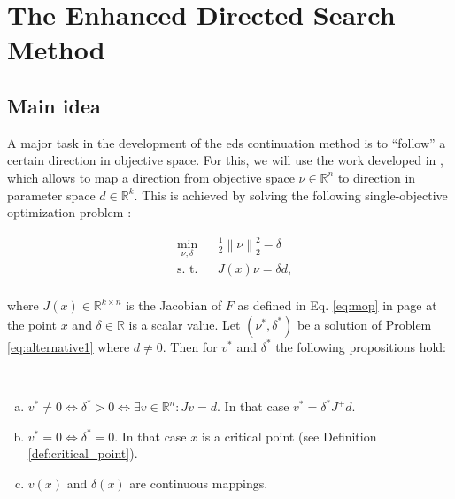 \section{The Enhanced Directed Search Method}
\label{sec:eds_method}

\subsection{Main idea}
\label{sec:direction_objective_space}

A major task in the development of the \gls{eds} continuation method is to ``follow'' a certain direction in objective space. For this, we will use the work developed in \cite{ds2}, which allows to map a direction from objective space $\nu \in \mathbb{R}^n$ to  direction  in parameter space $d \in \mathbb{R}^k$. This is achieved by solving the following single-objective optimization problem \cite{ds2}:

\begin{equation}
	\begin{aligned}
	& \underset{\nu, \delta}{\text{min}}
	& & \frac{1}{2}\left\| \nu \right\|_2^2 - \delta\\
	& \text{s. t.}
	& & J(x) \nu = \delta d,\\
	\end{aligned}
	\label{eq:alternative1}
\end{equation}

\noindent where $J(x) \in \mathbb{R}^{k \times n}$ is the Jacobian of $F$ as defined in Eq. \ref{eq:mop} in page \pageref{eq:mop} at the point $x$ and $\delta \in \mathbb{R}$ is a scalar value. Let $(\nu^*, \delta^*)$ be a solution of Problem \eqref{eq:alternative1} where $d \neq 0$. Then for $v^*$ and $\delta^*$ the following propositions \cite{ds2} hold:

\begin{proposition}\ \\
\label{proposition1}

\begin{enumerate}[a)]
\item $v^* \neq 0 \iff \delta^* > 0 \iff \exists v \in \mathbb{R}^n : Jv = d$. In that case  $v^* = \delta^*J^+d$.
\item $v^* = 0 \iff \delta^* = 0$. In that case $x$ is a critical point (see Definition \ref{def:critical_point}).
\item $v(x)$ and $\delta(x)$ are continuous mappings.
\end{enumerate}

\end{proposition}

